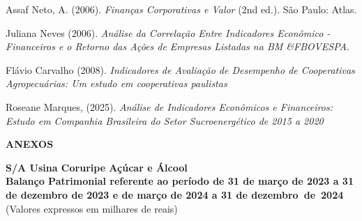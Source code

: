 \documentclass[1pt,a4paper]{article}
\begin{document}
	\begin{thebibliography}{9}
		
		Assaf Neto, A. (2006).
		\textit{Finanças Corporativas e Valor} (2nd ed.).
		São Paulo: Atlas.
		
		Juliana Neves (2006).
		\textit{Análise da Correlação Entre Indicadores Econômico - Financeiros e o Retorno das Ações de Empresas Listadas na BM \&FBOVESPA}.
		
		Flávio Carvalho (2008).
		\textit{Indicadores de Avaliação de Desempenho de Cooperativas Agropecuárias: Um estudo em cooperativas paulistas}
		
		Roseane Marques, (2025).
		\textit{Análise de Indicadores Econômicos e Financeiros: Estudo em Companhia Brasileira do Setor Sucroenergético de 2015 a 2020} 
		
	
		
	\end{thebibliography}
	
	
	\newpage
	\centering \textbf{ANEXOS}
		
		\begin{center}
			\textbf{\Large S/A Usina Coruripe Açúcar e Álcool}\\
			\textbf{Balanço Patrimonial referente ao período de 31 de março de 2023 a 31 de dezembro de 2023 e de março de 2024 a 31 de dezembro de 2024}\\
			(Valores expressos em milhares de reais)
			
		
		\end{center}
		
		
		
\end{document}
